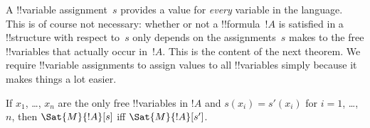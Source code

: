 \documentclass[../../include/open-logic-section]{subfiles}
\begin{document}
\begin{explain}
A !!{variable} assignment~$s$ provides a value for \emph{every} variable in
the language. This is of course not necessary: whether or not a
!!{formula}~$!A$ is satisfied in a !!{structure} with respect to~$s$ only
depends on the assignments~$s$ makes to the free !!{variable}s that
actually occur in~$!A$.  This is the content of the next theorem.  We
require !!{variable} assignments to assign values to all !!{variable}s simply
because it makes things a lot easier.
\end{explain}

\begin{prop}
If $x_1$, \dots, $x_n$ are the only free !!{variable}s in $!A$ and $s(x_i)
= s'(x_i)$ for $i = 1$, \dots, $n$, then $\Sat{M}{!A}[s]$ iff
$\Sat{M}{!A}[s']$.
\end{prop}
\end{document}

